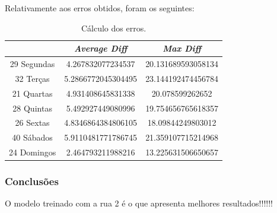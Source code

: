 \documentclass[a4paper, 12pt]{article}
\begin{document}
Relativamente aos erros obtidos, foram os seguintes:

\begin{table}[H]
	\centering
	\begin{tabular}{||c||c|c||}
		\hline\hline
		& \textit{Average Diff} & \textit{Max Diff} \\
		\hline\hline
		29 Segundas & 
4.267832077234537
 & 20.131689593058134\\
		\hline
		32 Terças  &
5.2866772045304495
 & 23.144192474456784 \\
		\hline
		21 Quartas & 
4.931408645831338
 & 20.078599262652 \\
		\hline
		28 Quintas  & 5.492927449080996

 & 19.754656765618357\\
		\hline
		26 Sextas & 
4.8346864384806105 & 18.09844249803012 \\
		\hline
		40 Sábados  & 5.9110481771786745
& 21.359107715214968 \\
		\hline
		24 Domingos & 
2.464793211988216
 & 13.225631506650657
 \\
		\hline\hline
	\end{tabular}
	\label{table:mod4_rua3}
	\caption{Cálculo dos erros.}
\end{table}

\subsubsection{Conclusões}

O modelo treinado com a rua 2 é o que apresenta melhores resultados!!!!!!
\end{document}
